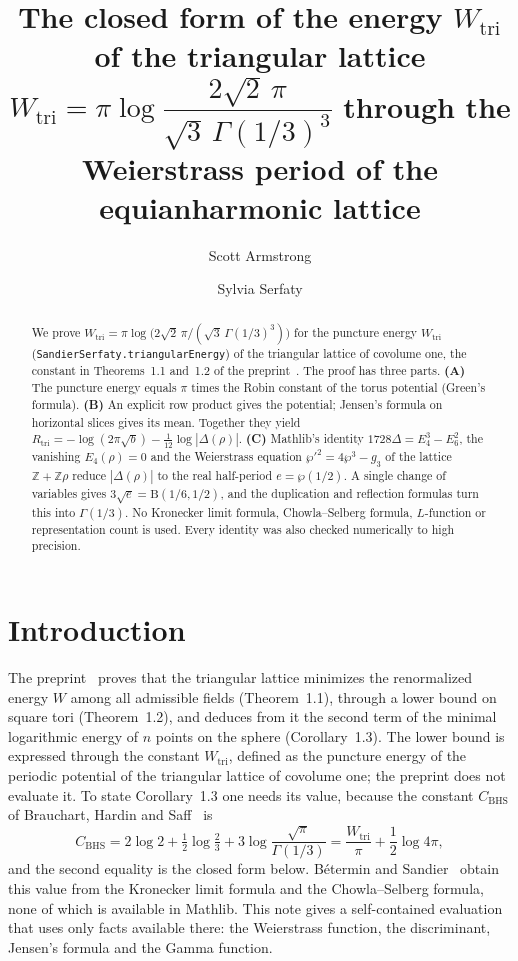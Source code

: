 \documentclass[11pt]{article}
\title{The closed form of the energy $W_{\mathrm{tri}}$ of the triangular lattice\\[2pt]
\large $W_{\mathrm{tri}}=\pi\log\dfrac{2\sqrt2\,\pi}{\sqrt3\,\Gamma(1/3)^3}$ through the
Weierstrass period of the equianharmonic lattice}
\author{Scott Armstrong \and Sylvia Serfaty}
\date{}
\theoremstyle{definition}
\theoremstyle{remark}
\newcommand{\Z}{\mathbb Z}
\newcommand{\lean}[1]{\texttt{#1}}
\begin{document}
\maketitle

\begin{abstract}
We prove $W_{\mathrm{tri}}=\pi\log\bigl(2\sqrt2\,\pi/(\sqrt3\,\Gamma(1/3)^3)\bigr)$ for the puncture energy
$W_{\mathrm{tri}}$ (\lean{SandierSerfaty.triangularEnergy}) of the triangular lattice of covolume one, the constant
in Theorems~1.1 and~1.2 of the preprint~\cite{Preprint}. The proof has three parts.
\textbf{(A)} The puncture energy equals $\pi$ times the Robin constant of the torus potential (Green's formula).
\textbf{(B)} An explicit row product gives the potential; Jensen's formula on horizontal slices gives its mean.
Together they yield $R_{\mathrm{tri}}=-\log(2\pi\sqrt b)-\tfrac1{12}\log|\Delta(\rho)|$.
\textbf{(C)} Mathlib's identity $1728\Delta=E_4^3-E_6^2$, the vanishing $E_4(\rho)=0$ and the Weierstrass equation
$\wp'^2=4\wp^3-g_3$ of the lattice $\Z+\Z\rho$ reduce $|\Delta(\rho)|$ to the real half-period
$e=\wp(1/2)$. A single change of variables gives $3\sqrt e=\mathrm B(1/6,1/2)$, and the duplication and
reflection formulas turn this into $\Gamma(1/3)$. No Kronecker limit formula, Chowla--Selberg formula,
$L$-function or representation count is used. Every identity was also checked numerically to high precision.
\end{abstract}

\section*{Introduction}
The preprint~\cite{Preprint} proves that the triangular lattice minimizes the renormalized energy $W$ among all
admissible fields (Theorem~1.1), through a lower bound on square tori (Theorem~1.2), and deduces from it the
second term of the minimal logarithmic energy of $n$ points on the sphere (Corollary~1.3). The lower bound is
expressed through the constant $W_{\mathrm{tri}}$, defined as the puncture energy of the periodic potential of the
triangular lattice of covolume one; the preprint does not evaluate it. To state Corollary~1.3 one needs its value,
because the constant $C_{\mathrm{BHS}}$ of Brauchart, Hardin and Saff~\cite{BrauchartHardinSaff2012} is
\[
 C_{\mathrm{BHS}}=2\log2+\tfrac12\log\tfrac23+3\log\frac{\sqrt\pi}{\Gamma(1/3)}
 =\frac{W_{\mathrm{tri}}}{\pi}+\frac12\log4\pi ,
\]
and the second equality is the closed form below. B\'etermin and Sandier~\cite[\S7.3]{BeterminSandier2018}
obtain this value from the Kronecker limit formula and the Chowla--Selberg formula, none of which is available in
Mathlib. This note gives a self-contained evaluation that uses only facts available there: the Weierstrass
function, the discriminant, Jensen's formula and the Gamma function.
\end{document}
